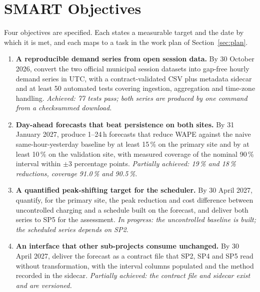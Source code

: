 \documentclass[10pt,a4paper]{article}
\begin{document}
\section{SMART Objectives}

Four objectives are specified. Each states a measurable target and the date by which it is met, and
each maps to a task in the work plan of Section~\ref{sec:plan}.

\begin{enumerate}[label=O\arabic*.]
  \item \textbf{A reproducible demand series from open session data.} By 30 October 2026, convert
        the two official municipal session datasets into gap-free hourly demand series in UTC, with
        a contract-validated CSV plus metadata sidecar and at least 50 automated tests covering
        ingestion, aggregation and time-zone handling. \emph{Achieved: 77 tests pass; both series
        are produced by one command from a checksummed download.}
  \item \textbf{Day-ahead forecasts that beat persistence on both sites.} By 31 January 2027,
        produce 1--24\,h forecasts that reduce WAPE against the naive same-hour-yesterday baseline
        by at least 15\,\% on the primary site and by at least 10\,\% on the validation site, with
        measured coverage of the nominal 90\,\% interval within $\pm$3 percentage points.
        \emph{Partially achieved: 19\,\% and 18\,\% reductions, coverage 91.0\,\% and 90.5\,\%.}
  \item \textbf{A quantified peak-shifting target for the scheduler.} By 30 April 2027, quantify,
        for the primary site, the peak reduction and cost difference between uncontrolled charging
        and a schedule built on the forecast, and deliver both series to SP5 for the assessment.
        \emph{In progress: the uncontrolled baseline is built; the scheduled series depends on SP2.}
  \item \textbf{An interface that other sub-projects consume unchanged.} By 30 April 2027, deliver
        the forecast as a contract file that SP2, SP4 and SP5 read without transformation, with the
        interval columns populated and the method recorded in the sidecar.
        \emph{Partially achieved: the contract file and sidecar exist and are versioned.}
\end{enumerate}
\end{document}
